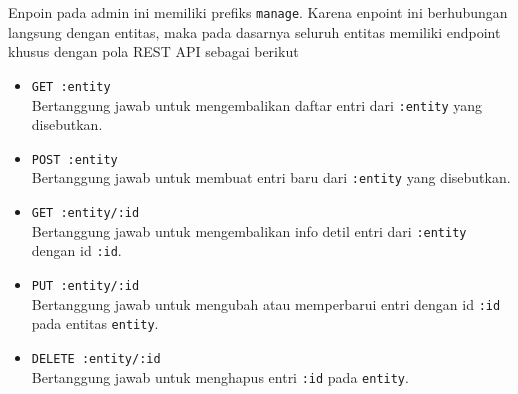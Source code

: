     Enpoin pada admin ini memiliki prefiks \texttt{manage}. Karena enpoint ini
    berhubungan langsung dengan entitas, maka pada dasarnya seluruh entitas
    memiliki endpoint khusus dengan pola REST API sebagai berikut
    \begin{itemize}
        \item \texttt{GET :entity} \\
            Bertanggung jawab untuk mengembalikan daftar entri dari
            \texttt{:entity} yang disebutkan.
            
        \item \texttt{POST :entity} \\
            Bertanggung jawab untuk membuat entri baru dari \texttt{:entity}
            yang disebutkan.
            
        \item \texttt{GET :entity/:id} \\
            Bertanggung jawab untuk mengembalikan info detil entri dari
            \texttt{:entity} dengan id \texttt{:id}.
            
        \item \texttt{PUT :entity/:id} \\
            Bertanggung jawab untuk mengubah atau memperbarui entri dengan id
            \texttt{:id} pada entitas \texttt{entity}.
        
        \item \texttt{DELETE :entity/:id} \\
            Bertanggung jawab untuk menghapus entri \texttt{:id} pada
            \texttt{entity}.
    \end{itemize}
    

